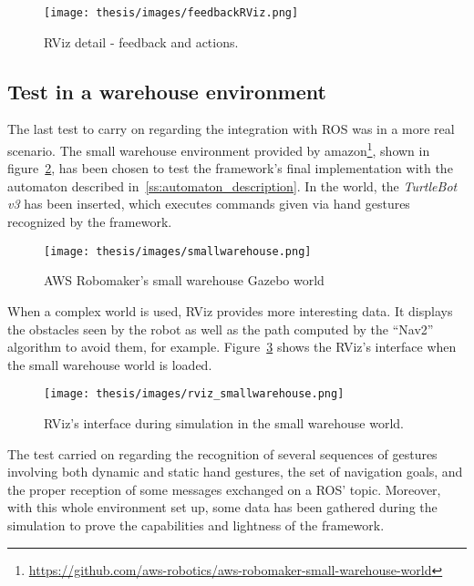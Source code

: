 \documentclass[../thesis.tex]{subfiles}
\begin{document}
\begin{figure}[H]
    \centering
    \texttt{[image: thesis/images/feedbackRViz.png]}
    \caption{RViz detail - feedback and actions.}
    \label{fig:rviz_feedback}
\end{figure}

\subsection{Test in a warehouse environment}

The last test to carry on regarding the integration with \gls{ROS} was in a more real scenario. The small warehouse environment provided by amazon\footnote{\href{https://github.com/aws-robotics/aws-robomaker-small-warehouse-world}{https://github.com/aws-robotics/aws-robomaker-small-warehouse-world}}, shown in figure~\ref{fig:small_warehouse_gazebo_world}, has been chosen to test the framework's final implementation with the automaton described in~\ref{ss:automaton_description}. In the world, the \textit{TurtleBot v3} has been inserted, which executes commands given via hand gestures recognized by the framework.

\begin{figure}[H]
    \centering
    \texttt{[image: thesis/images/smallwarehouse.png]}
    \caption{AWS Robomaker's small warehouse Gazebo world}
    \label{fig:small_warehouse_gazebo_world}
\end{figure}

When a complex world is used, RViz provides more interesting data. It displays the obstacles seen by the robot as well as the path computed by the ``Nav2'' algorithm to avoid them, for example. Figure~\ref{fig:rviz_smallwarehouse} shows the RViz's interface when the small warehouse world is loaded.

\begin{figure}[H]
    \centering
    \texttt{[image: thesis/images/rviz\_smallwarehouse.png]}
    \caption{RViz's interface during simulation in the small warehouse world.}
    \label{fig:rviz_smallwarehouse}
\end{figure}


The test carried on regarding the recognition of several sequences of gestures involving both dynamic and static hand gestures, the set of navigation goals, and the proper reception of some messages exchanged on a \gls{ROS}' topic. Moreover, with this whole environment set up, some data has been gathered during the simulation to prove the capabilities and lightness of the framework.
\end{document}
